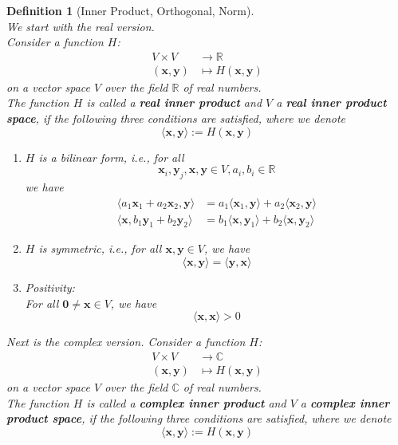 \documentclass[12pt]{article}
\newtheorem{definition}{Definition}[section]
\theoremstyle{definition}
\begin{document}
\begin{definition}[Inner Product, Orthogonal, Norm]
\hfill\\\normalfont
We start with the real version.\\
Consider a function $H$:
\[
\begin{aligned}
V\times V&\to \mathbb{R}\\
(\mathbf{x},\mathbf{y})&\mapsto H(\mathbf{x},\mathbf{y})
\end{aligned}
\]
on a vector space $V$ over the field $\mathbb{R}$ of real numbers.\\
The function $H$ is called a \textbf{real inner product} and $V$ a \textbf{real inner product space}, if the following three conditions are satisfied, where we denote
\[
\langle\mathbf{x},\mathbf{y}\rangle:=H(\mathbf{x},\mathbf{y})
\]
\begin{enumerate}[label=(\arabic*)]
\item $H$ is a bilinear form, i.e., for all
\[
\mathbf{x}_i, \mathbf{y}_j, \mathbf{x}, \mathbf{y}\in V, a_i, b_i\in\mathbb{R}
\]
we have
\[
\begin{aligned}
\langle a_1\mathbf{x}_1+a_2\mathbf{x}_2,\mathbf{y}\rangle &= a_1\langle \mathbf{x}_1, \mathbf{y}\rangle+a_2\langle \mathbf{x}_2, \mathbf{y}\rangle\\
\langle \mathbf{x}, b_1\mathbf{y}_1+b_2\mathbf{y}_2\rangle &= b_1\langle \mathbf{x}, \mathbf{y}_1\rangle+b_2\langle \mathbf{x}, \mathbf{y}_2\rangle
\end{aligned}
\]
\item $H$ is symmetric, i.e., for all $\mathbf{x},\mathbf{y}\in V$, we have
\[
\langle \mathbf{x},\mathbf{y}\rangle = \langle \mathbf{y},\mathbf{x}\rangle
\]
\item Positivity:\\
For all $\mathbf{0}\neq \mathbf{x}\in V$, we have
\[
\langle \mathbf{x},\mathbf{x}\rangle >0
\]
\end{enumerate}
Next is the complex version.
Consider a function $H$:
\[
\begin{aligned}
V\times V&\to \mathbb{C}\\
(\mathbf{x},\mathbf{y})&\mapsto H(\mathbf{x},\mathbf{y})
\end{aligned}
\]
on a vector space $V$ over the field $\mathbb{C}$ of real numbers.\\
The function $H$ is called a \textbf{complex inner product} and $V$ a \textbf{complex inner product space}, if the following three conditions are satisfied, where we denote
\[
\langle\mathbf{x},\mathbf{y}\rangle:=H(\mathbf{x},\mathbf{y})
\]
\end{definition}
\end{document}

